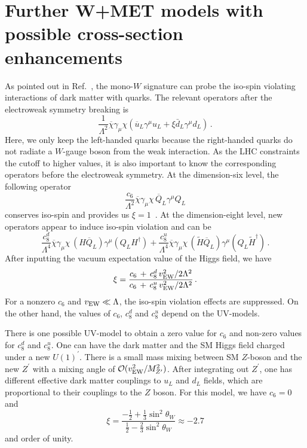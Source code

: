 \section{Further W+MET models with possible cross-section enhancements} 


As pointed out in Ref.~\cite{Bell:2015sza}, the mono-$W$ signature can probe the iso-spin violating interactions of dark matter with quarks. The relevant operators after the electroweak symmetry breaking is 
%
\begin{equation}
\frac{1}{\Lambda^2}\overline{\chi} \gamma_\mu \chi \left( \overline{u}_L \gamma^\mu u_L + \xi \bar{d}_L \gamma^\mu d_L \right) \,.
\end{equation}
%
Here, we only keep the left-handed quarks because the right-handed quarks do not radiate a $W$-gauge boson from the weak interaction. As the LHC constraints the cutoff to higher values, it is also important to know the corresponding operators before the electroweak symmetry. At the dimension-six level, the following operator
%
\begin{equation}
\frac{c_6}{\Lambda^2}\overline{\chi} \gamma_\mu \chi \,\overline{Q}_L \gamma^\mu Q_L 
\end{equation}
%
conserves iso-spin and provides us $\xi=1$~\cite{1503.07874}. At the dimension-eight level, new operators appear to induce iso-spin violation and can be
%
\begin{equation}
\frac{c^d_8}{\Lambda^4}\overline{\chi} \gamma_\mu \chi \,(H\overline{Q}_L) \gamma^\mu (Q_L H^\dagger) 
+ \frac{c^u_8}{\Lambda^4}\overline{\chi} \gamma_\mu \chi \,(\tilde{H}\overline{Q}_L) \gamma^\mu (Q_L \tilde{H}^\dagger)  \,.
\end{equation}
% 
After inputting the vacuum expectation value of the Higgs field, we have 
\begin{equation}
\xi = \frac{c_6 \,+\, c_8^d\,v_{\rm EW}^2/2\Lambda^2}{c_6 \,+\, c_8^u \,v_{\rm EW}^2/2\Lambda^2} \,.
\end{equation}
% 
For a nonzero $c_6$ and $v_{\rm EW} \ll \Lambda$, the iso-spin violation effects are suppressed. On the other hand, the values of $c_6$, $c^d_8$ and $c^u_8$ depend on the UV-models. 

There is one possible UV-model to obtain a zero value for $c_6$ and non-zero values for $c^d_8$ and $c^u_8$. One can have the dark matter and the SM Higgs field charged under a new $U(1)^\prime$. There is a small mass mixing between SM $Z$-boson and the new $Z^\prime$ with a mixing angle of ${\cal O}(v_{\rm EW}^2/M^2_{Z^\prime})$. After integrating out $Z^\prime$, one has different effective dark matter couplings to $u_L$ and $d_L$ fields, which are proportional to their couplings to the $Z$ boson. For this model, we have $c_6=0$ and 
\begin{equation}
\xi = \frac{-\frac{1}{2} + \frac{1}{3} \sin^2{\theta_W} }{ \frac{1}{2} - \frac{2}{3} \sin^2{\theta_W}} \approx  -2.7 
\end{equation}
%
and order of unity. 